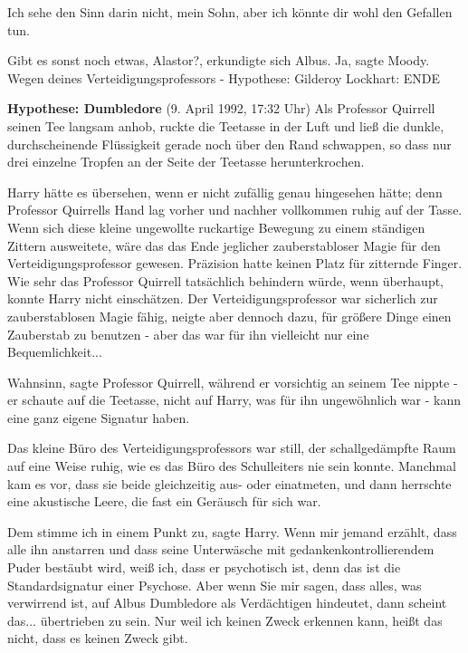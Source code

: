 \glqq Ich sehe den Sinn darin nicht, mein Sohn, aber ich könnte dir wohl den
Gefallen tun.\grqq{}

\glqq Gibt es sonst noch etwas, Alastor?\grqq{}, erkundigte sich Albus. \glqq
Ja\grqq{}, sagte Moody. \glqq Wegen deines Verteidigungsprofessors -\grqq{}
Hypothese: Gilderoy Lockhart: ENDE

\textbf{Hypothese: Dumbledore }(9. April 1992, 17:32 Uhr) Als Professor Quirrell
seinen Tee langsam anhob, ruckte die Teetasse in der Luft und ließ die dunkle,
durchscheinende Flüssigkeit gerade noch über den Rand schwappen, so dass nur
drei einzelne Tropfen an der Seite der Teetasse herunterkrochen.

Harry hätte es übersehen, wenn er nicht zufällig genau hingesehen hätte; denn
Professor Quirrells Hand lag vorher und nachher vollkommen ruhig auf der Tasse.
Wenn sich diese kleine ungewollte ruckartige Bewegung zu einem ständigen Zittern
ausweitete, wäre das das Ende jeglicher zauberstabloser Magie für den
Verteidigungsprofessor gewesen. Präzision hatte keinen Platz für zitternde
Finger. Wie sehr das Professor Quirrell tatsächlich behindern würde, wenn
überhaupt, konnte Harry nicht einschätzen. Der Verteidigungsprofessor war
sicherlich zur zauberstablosen Magie fähig, neigte aber dennoch dazu, für
größere Dinge einen Zauberstab zu benutzen - aber das war für ihn vielleicht nur
eine Bequemlichkeit...

\glqq Wahnsinn\grqq{}, sagte Professor Quirrell, während er vorsichtig an seinem
Tee nippte - er schaute auf die Teetasse, nicht auf Harry, was für ihn
ungewöhnlich war - \glqq kann eine ganz eigene Signatur haben.\grqq{}

Das kleine Büro des Verteidigungsprofessors war still, der schallgedämpfte Raum
auf eine Weise ruhig, wie es das Büro des Schulleiters nie sein konnte. Manchmal
kam es vor, dass sie beide gleichzeitig aus- oder einatmeten, und dann herrschte
eine akustische Leere, die fast ein Geräusch für sich war.

\glqq Dem stimme ich in einem Punkt zu\grqq{}, sagte Harry. \glqq Wenn mir
jemand erzählt, dass alle ihn anstarren und dass seine Unterwäsche mit
gedankenkontrollierendem Puder bestäubt wird, weiß ich, dass er psychotisch ist,
denn das ist die Standardsignatur einer Psychose. Aber wenn Sie mir sagen, dass
alles, was verwirrend ist, auf Albus Dumbledore als Verdächtigen hindeutet, dann
scheint das... übertrieben zu sein. Nur weil ich keinen Zweck erkennen kann,
heißt das nicht, dass es keinen Zweck gibt.\grqq{}

